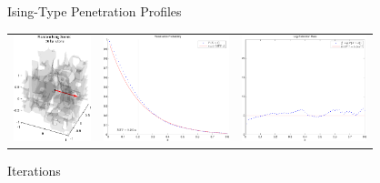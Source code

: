 \addtocounter{framenumber}{-1}
\begin{tframe}{Ising-Type Penetration Profiles}

\bigskip
\begin{center}
\begin{tabular}{ccc}
\includegraphics[height=1.2in]{media_exploration/ising_cell_036}&
\includegraphics[height=1.2in]{media_exploration/ising_penetration_036}&
\includegraphics[height=1.2in]{media_exploration/ising_extinction_036}
\end{tabular}
 \end{center}

 Iterations
\end{tframe}

